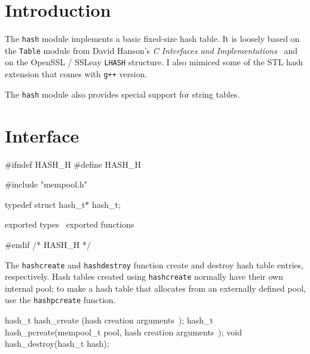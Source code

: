 
\section{Introduction}

The {\tt{}hash} module implements a basic fixed-size hash table.
It is loosely based on the {\tt{}Table} module from David Hanson's %
\emph{C Interfaces and Implementations}~\cite{Hans96} 
and on the OpenSSL / SSLeay {\tt{}LHASH} structure.  
I also mimiced some of the STL hash extension 
that comes with {\tt{}g++} version.

The {\tt{}hash} module also provides special support for string tables.


\section{Interface}

\endmoddef
#ifndef HASH_H
#define HASH_H

#include "mempool.h"

typedef struct hash_t* hash_t;

\LA{}exported types~{\nwtagstyle{}}\RA{}
\LA{}exported functions~{\nwtagstyle{}}\RA{}

#endif /* HASH_H */
\nwendcode{}\nwdocspar

The {\tt{}hash{}create} and {\tt{}hash{}destroy} function create and
destroy hash table entries, respectively.  Hash tables created
using {\tt{}hash{}create} normally have their own internal pool;
to make a hash table that allocates from an externally defined
pool, use the {\tt{}hash{}pcreate} function.

\nwenddocs{}\endmoddef
hash_t hash_create (\LA{}hash creation arguments~{\nwtagstyle{}}\RA{});
hash_t hash_pcreate(mempool_t pool,
                    \LA{}hash creation arguments~{\nwtagstyle{}}\RA{});
void   hash_destroy(hash_t hash);

\nwendcode{}\nwdocspar

